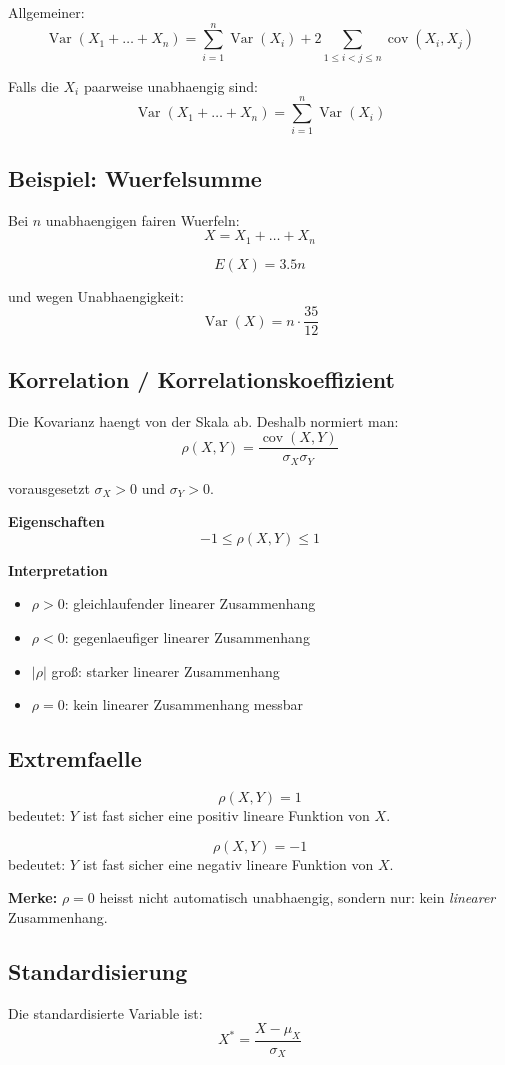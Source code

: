 \documentclass[a4paper,11pt]{article}
\begin{document}
Allgemeiner:
\[
\operatorname{Var}(X_1+\dots+X_n)
=\sum_{i=1}^n \operatorname{Var}(X_i)
+2\sum_{1\le i<j\le n}\operatorname{cov}(X_i,X_j)
\]

Falls die $X_i$ paarweise unabhaengig sind:
\[
\operatorname{Var}(X_1+\dots+X_n)=\sum_{i=1}^n \operatorname{Var}(X_i)
\]

\subsection{Beispiel: Wuerfelsumme}
Bei $n$ unabhaengigen fairen Wuerfeln:
\[
X=X_1+\dots+X_n
\]

\[
E(X)=3.5n
\]

und wegen Unabhaengigkeit:
\[
\operatorname{Var}(X)=n\cdot \frac{35}{12}
\]

\subsection{Korrelation / Korrelationskoeffizient}
Die Kovarianz haengt von der Skala ab. Deshalb normiert man:
\[
\rho(X,Y)=\frac{\operatorname{cov}(X,Y)}{\sigma_X\sigma_Y}
\]

vorausgesetzt $\sigma_X>0$ und $\sigma_Y>0$.

\textbf{Eigenschaften}
\[
-1 \le \rho(X,Y)\le 1
\]

\textbf{Interpretation}
\begin{itemize}
  \item $\rho>0$: gleichlaufender linearer Zusammenhang
  \item $\rho<0$: gegenlaeufiger linearer Zusammenhang
  \item $|\rho|$ groß: starker linearer Zusammenhang
  \item $\rho=0$: kein linearer Zusammenhang messbar
\end{itemize}

\subsection{Extremfaelle}
\[
\rho(X,Y)=1
\]
bedeutet: $Y$ ist fast sicher eine positiv lineare Funktion von $X$.

\[
\rho(X,Y)=-1
\]
bedeutet: $Y$ ist fast sicher eine negativ lineare Funktion von $X$.

\textbf{Merke:}
$\rho=0$ heisst nicht automatisch unabhaengig, sondern nur: kein \emph{linearer} Zusammenhang.

\subsection{Standardisierung}
Die standardisierte Variable ist:
\[
X^*=\frac{X-\mu_X}{\sigma_X}
\]
\end{document}
